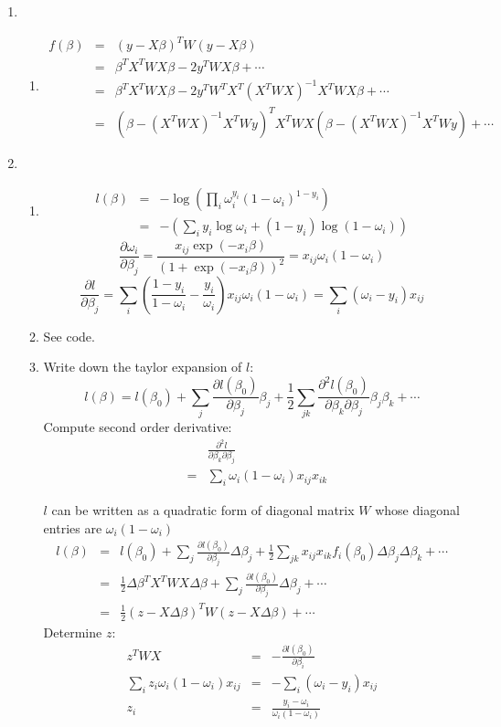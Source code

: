 \documentclass{article}
\begin{document}
\begin{enumerate}
\item
\begin{enumerate}[A]
\item
\begin{eqnarray}
f(\beta)&=&(y-X\beta)^TW(y-X\beta)\nonumber\\
&=&\beta^TX^TWX\beta-2y^TWX\beta+\cdots\nonumber\\
&=&\beta^T X^TWX\beta-2y^TW^TX^T(X^TWX)^{-1}X^TWX\beta+\cdots\nonumber\\
&=&(\beta-(X^TWX)^{-1}X^TWy)^TX^TWX(\beta-(X^TWX)^{-1}X^TWy)+\cdots
\end{eqnarray}
\end{enumerate}
\item
\begin{enumerate}[A]
\item
\begin{eqnarray}
l(\beta)&=&-\log(\prod_i\omega_i^{y_i}(1-\omega_i)^{1-y_i})\nonumber\\
&=&-(\sum_iy_i\log\omega_i+(1-y_i)\log(1-\omega_i))
\end{eqnarray}
\[
\frac{\partial\omega_i}{\partial\beta_j}=\frac{x_{ij}\exp(-x_i\beta)}{(1+\exp(-x_i\beta))^2}=x_{ij}\omega_i(1-\omega_i)
\]
\[
\frac{\partial l}{\partial\beta_j}=\sum_i(\frac{1-y_i}{1-\omega_i}-\frac{y_i}{\omega_i})x_{ij}\omega_i(1-\omega_i)=\sum_i(\omega_i-y_i)x_{ij}
\]
\item
See code.
\item
Write down the taylor expansion of $l$:
\[
l(\beta)=l(\beta_0)+\sum_j\frac{\partial l(\beta_0)}{\partial\beta_j}\beta_j+\frac{1}{2}\sum_{jk}\frac{\partial^2l(\beta_0)}{\partial\beta_k\partial\beta_j}\beta_j\beta_k+\cdots
\]
Compute second order derivative:
\begin{eqnarray}
&&\frac{\partial^2 l}{\partial\beta_k\partial\beta_j}\nonumber\\
&=&\sum_i\omega_i(1-\omega_i)x_{ij}x_{ik}
\end{eqnarray}

$l$ can be written as a quadratic form of diagonal matrix $W$ whose diagonal entries are $\omega_i(1-\omega_i)$
\begin{eqnarray}
l(\beta)&=&l(\beta_0)+\sum_j\frac{\partial l(\beta_0)}{\partial\beta_j}\Delta\beta_j+\frac{1}{2}\sum_{jk}x_{ij}x_{ik}f_i(\beta_0)\Delta\beta_j\Delta\beta_k+\cdots\nonumber\\
&=&\frac{1}{2}\Delta\beta^TX^TWX\Delta\beta+\sum_j\frac{\partial l(\beta_0)}{\partial\beta_j}\Delta\beta_j+\cdots\nonumber\\
&=&\frac{1}{2}(z-X\Delta\beta)^TW(z-X\Delta\beta)+\cdots
\end{eqnarray}
Determine $z$:
\begin{eqnarray}
z^TWX&=&-\frac{\partial l(\beta_0)}{\partial\beta_i}\nonumber\\
\sum_iz_i\omega_i(1-\omega_i)x_{ij}&=&-\sum_i(\omega_i-y_i)x_{ij}\nonumber\\
z_i&=&\frac{y_i-\omega_i}{\omega_i(1-\omega_i)}
\end{eqnarray}
\end{enumerate}
\end{enumerate}
\end{document}
